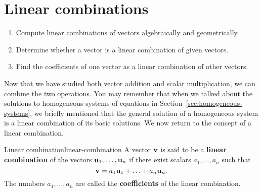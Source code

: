 \section{Linear combinations}
\label{sec:linear-combinations-rn}

\begin{outcome}
  \begin{enumerate}
  \item Compute linear combinations of vectors algebraically and
    geometrically.
  \item Determine whether a vector is a linear combination of given
    vectors.
  \item Find the coefficients of one vector as a linear combination of
    other vectors.
  \end{enumerate}
\end{outcome}

Now that we have studied both vector addition and scalar
multiplication, we can combine the two operations. You may remember
that when we talked about the solutions to homogeneous systems of
equations in Section~\ref{sec:homogeneous-systems}, we briefly
mentioned that the general solution of a homogeneous system is a
linear combination of its basic solutions. We now return to the
concept of a linear combination.

\begin{definition}{Linear combination}{linear-combination}
  A vector $\mbox{\bf v}$ is said to be a \textbf{linear combination}%
   of the vectors
  $\mbox{\bf u}_1,\ldots, \mbox{\bf u}_n$ if there exist scalars
  $a_{1},\ldots,a_{n}$ such that
  \begin{equation*}
    \mbox{\bf v} = a_1 \mbox{\bf u}_1 + \ldots + a_n \mbox{\bf u}_n.
  \end{equation*}
  The numbers $a_1,\ldots,a_n$ are called the
  \textbf{coefficients}
  of the linear combination.
\end{definition}

